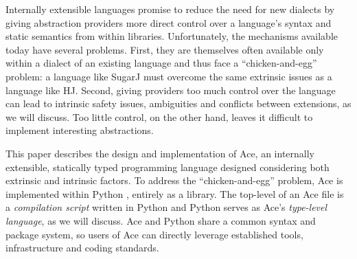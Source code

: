 \documentclass[10pt,preprint]{sigplanconf}
\begin{document}


Internally extensible languages promise to reduce the need for new dialects by giving abstraction providers more direct control over a language's syntax and static semantics from within libraries. %
Unfortunately, the mechanisms available today have several problems. First, they are themselves often available only within a dialect of an existing language and thus face a ``chicken-and-egg'' problem: a language like SugarJ \cite{erdweg2011sugarj} must overcome the same extrinsic issues as a language like HJ. Second, giving providers too much control over the language can lead to intrinsic safety issues, ambiguities and conflicts between extensions, as we will discuss. Too little control, on the other hand, leaves it difficult to implement interesting abstractions.%

This paper describes the design and implementation of Ace, an internally extensible, statically typed programming language designed considering both extrinsic and intrinsic factors. To address the ``chicken-and-egg'' problem, Ace is implemented within Python \cite{Politz:2013:PFM:2509136.2509536,python}, entirely as a library. The top-level of an Ace file is a \emph{compilation script} written in Python and Python serves as Ace's \emph{type-level language}, as we will discuss.  Ace and Python share a common syntax and package system, so users of Ace can directly leverage established tools, infrastructure and coding standards. %
\end{document}
